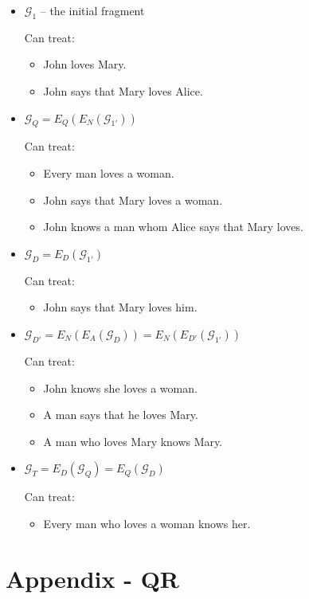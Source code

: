 \documentclass{article}
\begin{document}
\begin{itemize}
\item $\mathcal{G}_1$ -- the initial fragment

  Can treat:
  \begin{itemize}
  \item John loves Mary.
  \item John says that Mary loves Alice.
  \end{itemize}

\item $\mathcal{G}_Q = E_Q(E_N(\mathcal{G}_{1'}))$

  Can treat:
  \begin{itemize}
  \item Every man loves a woman.
  \item John says that Mary loves a woman.
  \item John knows a man whom Alice says that Mary loves.
  \end{itemize}
  
\item $\mathcal{G}_D = E_D(\mathcal{G}_{1'})$

  Can treat:
  \begin{itemize}
  \item John says that Mary loves him.
  \end{itemize}

\item $\mathcal{G}_{D'} = E_N(E_A(\mathcal{G}_D)) = E_N(E_{D'}(\mathcal{G}_{1'}))$

  Can treat:
  \begin{itemize}
  \item John knows she loves a woman.
  \item A man says that he loves Mary.
  \item A man who loves Mary knows Mary.
  \end{itemize}

\item $\mathcal{G}_T = E_D(\mathcal{G}_Q) = E_Q(\mathcal{G}_D)$

  Can treat:
  \begin{itemize}
  \item Every man who loves a woman knows her.
  \end{itemize}
\end{itemize}


\section*{Appendix - QR}
\end{document}
